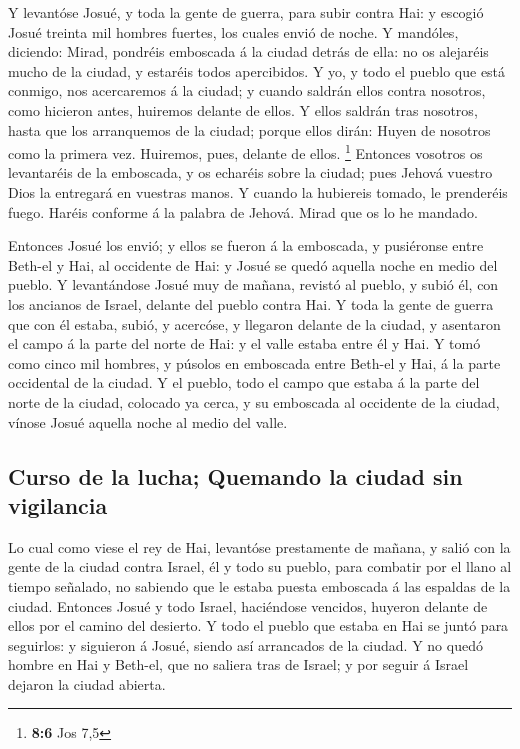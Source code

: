  Y levantóse Josué, y toda la gente de guerra, para subir
contra Hai: y escogió Josué treinta mil hombres fuertes, los cuales
envió de noche.  Y mandóles, diciendo: Mirad, pondréis
emboscada á la ciudad detrás de ella: no os alejaréis mucho de la
ciudad, y estaréis todos apercibidos.  Y yo, y todo el
pueblo que está conmigo, nos acercaremos á la ciudad; y cuando saldrán
ellos contra nosotros, como hicieron antes, huiremos delante de ellos.
 Y ellos saldrán tras nosotros, hasta que los arranquemos de
la ciudad; porque ellos dirán: Huyen de nosotros como la primera vez.
Huiremos, pues, delante de ellos. \footnote{\textbf{8:6} Jos 7,5}
 Entonces vosotros os levantaréis de la emboscada, y os
echaréis sobre la ciudad; pues Jehová vuestro Dios la entregará en
vuestras manos.  Y cuando la hubiereis tomado, le prenderéis
fuego. Haréis conforme á la palabra de Jehová. Mirad que os lo he
mandado.

 Entonces Josué los envió; y ellos se fueron á la emboscada,
y pusiéronse entre Beth-el y Hai, al occidente de Hai: y Josué se quedó
aquella noche en medio del pueblo.  Y levantándose Josué
muy de mañana, revistó al pueblo, y subió él, con los ancianos de
Israel, delante del pueblo contra Hai.  Y toda la gente de
guerra que con él estaba, subió, y acercóse, y llegaron delante de la
ciudad, y asentaron el campo á la parte del norte de Hai: y el valle
estaba entre él y Hai.  Y tomó como cinco mil hombres, y
púsolos en emboscada entre Beth-el y Hai, á la parte occidental de la
ciudad.  Y el pueblo, todo el campo que estaba á la parte
del norte de la ciudad, colocado ya cerca, y su emboscada al occidente
de la ciudad, vínose Josué aquella noche al medio del valle.

\hypertarget{curso-de-la-lucha-quemando-la-ciudad-sin-vigilancia}{%
\subsection{Curso de la lucha; Quemando la ciudad sin
vigilancia}\label{curso-de-la-lucha-quemando-la-ciudad-sin-vigilancia}}

 Lo cual como viese el rey de Hai, levantóse prestamente de
mañana, y salió con la gente de la ciudad contra Israel, él y todo su
pueblo, para combatir por el llano al tiempo señalado, no sabiendo que
le estaba puesta emboscada á las espaldas de la ciudad. 
Entonces Josué y todo Israel, haciéndose vencidos, huyeron delante de
ellos por el camino del desierto.  Y todo el pueblo que
estaba en Hai se juntó para seguirlos: y siguieron á Josué, siendo así
arrancados de la ciudad.  Y no quedó hombre en Hai y
Beth-el, que no saliera tras de Israel; y por seguir á Israel dejaron la
ciudad abierta.

